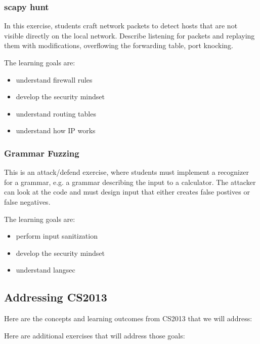 \subsubsection{scapy hunt}
In this exercise, students craft network packets to detect hosts that are not visible directly on
the local network.  Describe listening for packets and replaying them with modifications, overflowing
the forwarding table, port knocking.

The learning goals are:
\begin{itemize}
\item understand firewall rules
\item develop the security mindset
\item understand routing tables
\item understand how IP works
\end{itemize}


\subsubsection{Grammar Fuzzing}
This is an attack/defend exercise, where students must implement a recognizer for a grammar,
e.g. a grammar describing the input to a calculator.  The attacker can look at the code and
must design input that either creates false postives or false negatives.

The learning goals are:
\begin{itemize}
\item perform input sanitization
\item develop the security mindset
\item understand langsec
\end{itemize}

\subsection{Addressing CS2013}
Here are the concepts and learning outcomes from CS2013 that we will address:


Here are additional exercises that will address those goals:


